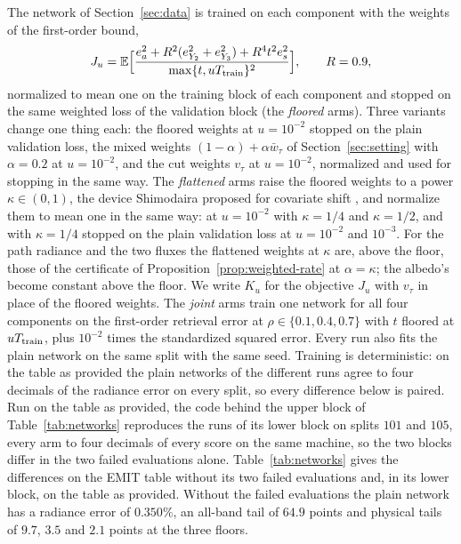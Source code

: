 \documentclass[11pt]{article}
\theoremstyle{remark}
\newcommand{\E}{\mathbb{E}}
\newcommand{\1}{\mathbf{1}}
\begin{document}
The network of Section~\ref{sec:data} is trained on each component with the weights of the first-order bound,
\[
J_u=\E\Bigl[\frac{e_a^2+R^2(e_{Y_2}^2+e_{Y_3}^2)+R^4t^2e_s^2}{\max\{t,uT_{\rm train}\}^2}\Bigr],\qquad R=0.9,
\]
normalized to mean one on the training block of each component and stopped on the same weighted loss of the
validation block (the \emph{floored} arms). Three variants change one thing each: the floored weights at $u=10^{-2}$
stopped on the plain validation loss, the mixed weights $(1-\alpha)+\alpha\bar w_\tau$ of Section~\ref{sec:setting} with
$\alpha=0.2$ at $u=10^{-2}$, and the cut weights $v_\tau$ at $u=10^{-2}$, normalized and
used for stopping in the same way. The \emph{flattened} arms raise the floored weights to a power $\kappa\in(0,1)$, the
device Shimodaira proposed for covariate shift \cite{shimodaira}, and normalize them to mean one in the same way: at
$u=10^{-2}$ with $\kappa=1/4$ and $\kappa=1/2$, and with $\kappa=1/4$ stopped on the plain validation loss at $u=10^{-2}$
and $10^{-3}$. For the path radiance and the two fluxes the flattened weights at $\kappa$ are, above the floor, those of
the certificate of Proposition~\ref{prop:weighted-rate} at $\alpha=\kappa$; the albedo's become constant above the
floor. We write $K_u$ for the objective $J_u$ with $v_\tau$ in place of the floored weights.
The \emph{joint} arms train one network for all four components on the first-order retrieval error at
$\rho\in\{0.1,0.4,0.7\}$ with $t$ floored at $uT_{\rm train}$, plus $10^{-2}$ times the standardized squared error.
Every run also fits the plain network on the same split with the same seed. Training is deterministic: on the table as
provided the plain networks of the different runs agree to four decimals of the radiance error on every split, so
every difference below is paired. Run on the table as provided, the code behind the upper block of
Table~\ref{tab:networks} reproduces the runs of its lower block on splits $101$ and $105$, every arm to four decimals of
every score on the same machine, so the two blocks differ in the two failed evaluations alone. Table~\ref{tab:networks} gives the differences on the EMIT table without its two
failed evaluations and, in its lower block, on the table as provided. Without the failed evaluations the plain network
has a radiance error of $0.350\%$, an all-band tail of $64.9$ points and physical tails of $9.7$, $3.5$ and $2.1$ points
at the three floors.
\end{document}
